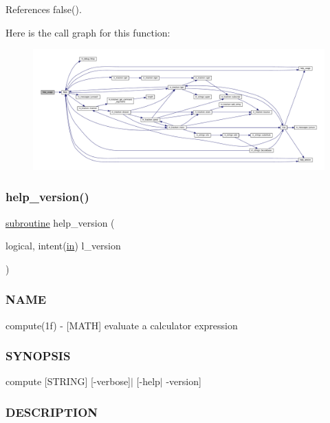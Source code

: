 References false().

Here is the call graph for this function\+:
\nopagebreak
\begin{figure}[H]
\begin{center}
\leavevmode
\includegraphics[width=350pt]{compute_8f90_a3e09a3b52ee8fb04eeb93fe5761626a8_cgraph}
\end{center}
\end{figure}
\mbox{\label{compute_8f90_a39c21619b08a3c22f19e2306efd7f766}} 
\subsubsection{\texorpdfstring{help\+\_\+version()}{help\_version()}}
{\footnotesize\ttfamily \hyperlink{M__stopwatch_83_8txt_acfbcff50169d691ff02d4a123ed70482}{subroutine} help\+\_\+version (\begin{DoxyParamCaption}\item[{logical, intent(\hyperlink{M__journal_83_8txt_afce72651d1eed785a2132bee863b2f38}{in})}]{l\+\_\+version }\end{DoxyParamCaption})}



\subsubsection*{N\+A\+ME}

compute(1f) -\/ \mbox{[}M\+A\+TH\mbox{]} evaluate a calculator expression \subsubsection*{S\+Y\+N\+O\+P\+S\+IS}

compute \mbox{[}S\+T\+R\+I\+NG\mbox{]} \mbox{[}-\/verbose\mbox{]}$\vert$ \mbox{[}-\/help$\vert$ -\/version\mbox{]} \subsubsection*{D\+E\+S\+C\+R\+I\+P\+T\+I\+ON}


